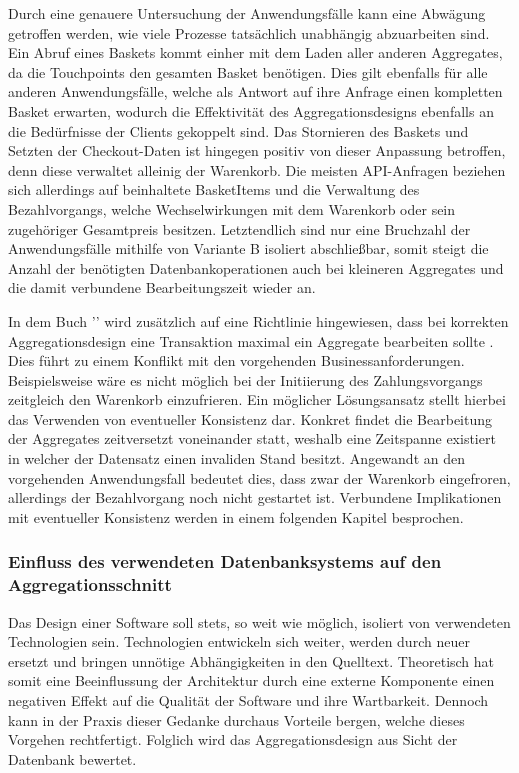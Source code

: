 Durch eine genauere Untersuchung der Anwendungsfälle kann eine Abwägung getroffen werden, wie viele Prozesse tatsächlich unabhängig abzuarbeiten sind. Ein Abruf eines Baskets kommt einher mit dem Laden aller anderen Aggregates, da die Touchpoints den gesamten Basket benötigen. Dies gilt ebenfalls für alle anderen Anwendungsfälle, welche als Antwort auf ihre Anfrage einen kompletten Basket erwarten, wodurch die Effektivität des Aggregationsdesigns ebenfalls an die Bedürfnisse der Clients gekoppelt sind. Das Stornieren des Baskets und Setzten der Checkout-Daten ist hingegen positiv von dieser Anpassung betroffen, denn diese verwaltet alleinig der Warenkorb. Die meisten API-Anfragen beziehen sich allerdings auf beinhaltete BasketItems und die Verwaltung des Bezahlvorgangs, welche Wechselwirkungen mit dem Warenkorb oder sein zugehöriger Gesamtpreis besitzen. Letztendlich sind nur eine Bruchzahl der Anwendungsfälle mithilfe von Variante B isoliert abschließbar, somit steigt die Anzahl der benötigten Datenbankoperationen auch bei kleineren Aggregates und die damit verbundene Bearbeitungszeit wieder an.

In dem Buch '' wird zusätzlich auf eine Richtlinie hingewiesen, dass bei korrekten Aggregationsdesign eine Transaktion maximal ein Aggregate bearbeiten sollte \cite[S. 354]{Evans.2011}. Dies führt zu einem Konflikt mit den vorgehenden Businessanforderungen. Beispielsweise wäre es nicht möglich bei der Initiierung des Zahlungsvorgangs zeitgleich den Warenkorb einzufrieren. Ein möglicher Lösungsansatz stellt hierbei das Verwenden von eventueller Konsistenz dar. Konkret findet die Bearbeitung der Aggregates zeitversetzt voneinander statt, weshalb eine Zeitspanne existiert in welcher der Datensatz einen invaliden Stand besitzt. Angewandt an den vorgehenden Anwendungsfall bedeutet dies, dass zwar der Warenkorb eingefroren, allerdings der Bezahlvorgang noch nicht gestartet ist. Verbundene Implikationen mit eventueller Konsistenz werden in einem folgenden Kapitel besprochen.

\subsubsection{Einfluss des verwendeten Datenbanksystems auf den Aggregationsschnitt}

Das Design einer Software soll stets, so weit wie möglich, isoliert von verwendeten Technologien sein. Technologien entwickeln sich weiter, werden durch neuer ersetzt und bringen unnötige Abhängigkeiten in den Quelltext. Theoretisch hat somit eine Beeinflussung der Architektur durch eine externe Komponente einen negativen Effekt auf die Qualität der Software und ihre Wartbarkeit. Dennoch kann in der Praxis dieser Gedanke durchaus Vorteile bergen, welche dieses Vorgehen rechtfertigt. Folglich wird das Aggregationsdesign aus Sicht der Datenbank bewertet.

